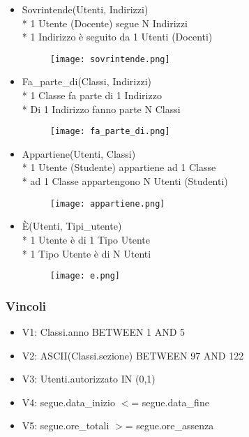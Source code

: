 \documentclass[12pt]{article}
\begin{document}
\begin{itemize}
    \item Sovrintende(Utenti, Indirizzi)\\*
    1 Utente (Docente) segue N Indirizzi\\*
    1 Indirizzo è seguito da 1 Utenti (Docenti)
    \begin{figure}[h]
        \begin{center}
        \texttt{[image: sovrintende.png]}
        \end{center}
    \end{figure}
    \item Fa\_parte\_di(Classi, Indirizzi)\\*
    1 Classe fa parte di 1 Indirizzo\\*
    Di 1 Indirizzo fanno parte N Classi
    \begin{figure}[h]
        \begin{center}
        \texttt{[image: fa\_parte\_di.png]}
        \end{center}
    \end{figure}
    \item Appartiene(Utenti, Classi)\\*
    1 Utente (Studente) appartiene ad 1 Classe\\*
    ad 1 Classe appartengono N Utenti (Studenti)
    \begin{figure}[h]
        \begin{center}
        \texttt{[image: appartiene.png]}
        \end{center}
    \end{figure}
    
    \newpage
    
    \item È(Utenti, Tipi\_utente)\\*
    1 Utente è di 1 Tipo Utente\\*
    1 Tipo Utente è di N Utenti
    \begin{figure}[h]
        \begin{center}
        \texttt{[image: e.png]}
        \end{center}
    \end{figure}
    
\end{itemize}

\subsubsection{Vincoli}
\begin{itemize}
    \item[] V1: Classi.anno BETWEEN 1 AND 5
    \item[] V2: ASCII(Classi.sezione) BETWEEN 97 AND 122
    \item[] V3: Utenti.autorizzato IN (0,1)
    \item[] V4: segue.data\_inizio $<$= segue.data\_fine
    \item[] V5: segue.ore\_totali $>$= segue.ore\_assenza
\end{itemize}
\end{document}
